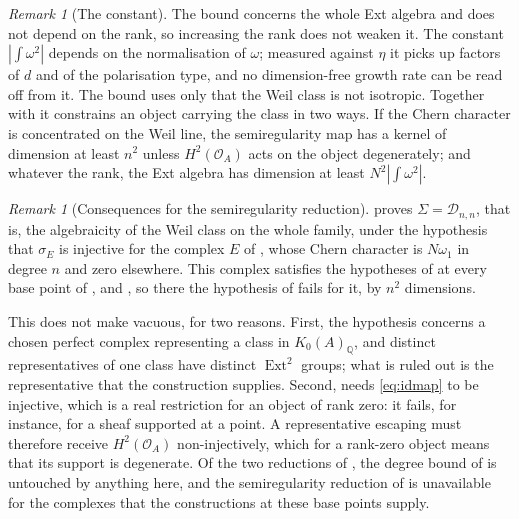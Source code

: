 \documentclass[11pt,reqno]{amsart}
\theoremstyle{plain}
\theoremstyle{definition}
\theoremstyle{remark}
\newtheorem{remark}[theorem]{Remark}
\newcommand{\QQ}{\mathbb{Q}}
\newcommand{\cO}{\mathcal{O}}
\newcommand{\cD}{\mathcal{D}}
\DeclareMathOperator{\Ext}{Ext}
\begin{document}
\begin{remark}[The constant]\label{rem:sizeconstant}
The bound concerns the whole Ext algebra and does not depend on the rank, so
increasing the rank does not weaken it. The constant $|\int\omega^{2}|$
depends on the normalisation of $\omega$; measured against $\eta$ it picks up
factors of $d$ and of the polarisation type, and no dimension-free growth
rate can be read off from it. The bound uses only that the Weil class is not
isotropic. Together with  it constrains an object
carrying the class in two ways. If the Chern character is concentrated on the
Weil line, the semiregularity map has a kernel of dimension at least $n^{2}$
unless $H^{2}(\cO_{A})$ acts on the object degenerately; and whatever the
rank, the Ext algebra has dimension at least $N^{2}|\int\omega^{2}|$.
\end{remark}

\begin{remark}[Consequences for the semiregularity reduction]
\label{rem:killsreduction}
\cite[Theorem~2.3]{paperII} proves $\Sigma=\cD_{n,n}$, that is, the
algebraicity of the Weil class on the whole family, under the hypothesis that
$\sigma_{E}$ is injective for the complex $E$ of \cite[Proposition~2.1]{paperII}, whose
Chern character is $N\omega_{1}$ in degree $n$ and zero elsewhere. This
complex satisfies the hypotheses of  at every base
point of ,  and
, so there the hypothesis of \cite[Theorem~2.3]{paperII} fails
for it, by $n^{2}$ dimensions.

This does not make \cite[Theorem~2.3]{paperII} vacuous, for two reasons. First,
the hypothesis concerns a chosen perfect complex representing a class in
$K_{0}(A)_{\QQ}$, and distinct representatives of one class have distinct
$\Ext^{2}$ groups; what is ruled out is the representative that the
construction supplies. Second,  needs
\eqref{eq:idmap} to be injective, which is a real restriction for an object
of rank zero: it fails, for instance, for a sheaf supported at a point. A
representative escaping  must therefore
receive $H^{2}(\cO_{A})$ non-injectively, which for a rank-zero object means
that its support is degenerate. Of the two reductions of
, the degree bound of  is untouched
by anything here, and the semiregularity reduction of
\cite[Theorem~2.3]{paperII} is unavailable for the complexes that the
constructions at these base points supply.
\end{remark}
\end{document}
